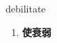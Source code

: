 
\begin{frame}
{\huge debilitate}
\begin{center}
\begin{enumerate}\Large
  \item \textbf{使衰弱}
\end{enumerate}
\end{center}
\end{frame}
